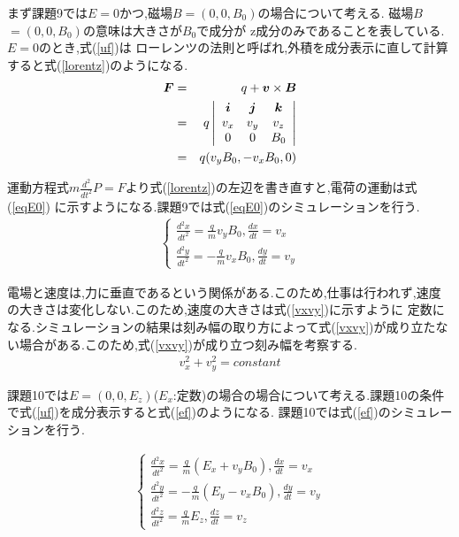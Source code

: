 \documentclass[a4j]{jarticle}
\begin{document}
      まず課題9では\mbox{\boldmath $E$}$=0$かつ,磁場\mbox{\boldmath $B$}$=(0,0,B_0)$の場合について考える.
      磁場\mbox{\boldmath $B$}$=(0,0,B_0)$の意味は大きさが$B_0$で成分が
      z成分のみであることを表している. \mbox{\boldmath $E$}$=0$のとき,式(\ref{uf})は
      ローレンツの法則と呼ばれ,外積を成分表示に直して計算すると式(\ref{lorentz})のようになる.
      \begin{eqnarray}
        \mbox{\boldmath $F$} &=& q+\mbox{\boldmath $v$} \times \mbox{\boldmath $B$} \\
        &=& q
        \left|
          \begin{array}{ccc}
            \mbox{\boldmath $i$} & \mbox{\boldmath $j$} & \mbox{\boldmath $k$} \\
            v_x & v_y & v_z \\
            0 & 0 & B_0 
          \end{array}
        \right| \\
        &=& q(v_y B_0,-v_x B_0,0)
      \label{lorentz}
    \end{eqnarray}

    運動方程式$m\frac{d^2}{dt^2}$\mbox{\boldmath $P$}$=$\mbox{\boldmath $F$}より式(\ref{lorentz})の左辺を書き直すと,電荷の運動は式(\ref{eqE0})
    に示すようになる.課題9では式(\ref{eqE0})のシミュレーションを行う.
    \begin{eqnarray}
      \begin{cases}
        \frac{d^2x}{dt^2} = \frac{q}{m}v_y B_0 , \frac{dx}{dt} = v_x \\
        \frac{d^2y}{dt^2} = -\frac{q}{m}v_x B_0 , \frac{dy}{dt} = v_y 
      \end{cases}
      \label{eqE0}
    \end{eqnarray}

    電場と速度は,力に垂直であるという関係がある.このため,仕事は行われず,速度の大きさは変化しない.このため,速度の大きさは式(\ref{vxvy})に示すように
    定数になる.シミュレーションの結果は刻み幅の取り方によって式(\ref{vxvy})が成り立たない場合がある.このため,式(\ref{vxvy})が成り立つ刻み幅を考察する.
    \begin{eqnarray}
      v_x ^2 + v_y ^2 = constant
      \label{vxvy}
    \end{eqnarray}

    課題10では\mbox{\boldmath $E$}$=(0,0,E_z)$($E_x$:定数)の場合の場合について考える.課題10の条件で式(\ref{uf})を成分表示すると式(\ref{ef})のようになる.
    課題10では式(\ref{ef})のシミュレーションを行う.

    \begin{eqnarray}
      \begin{cases}
        \frac{d^2x}{dt^2} = \frac{q}{m}(E_x + v_y B_0) , \frac{dx}{dt} = v_x \\
        \frac{d^2y}{dt^2} = -\frac{q}{m}(E_y - v_x B_0) , \frac{dy}{dt} = v_y \\
        \frac{d^2z}{dt^2} = \frac{q}{m}E_z , \frac{dz}{dt} = v_z
      \end{cases}
      \label{ef}
    \end{eqnarray}
    
\end{document}

